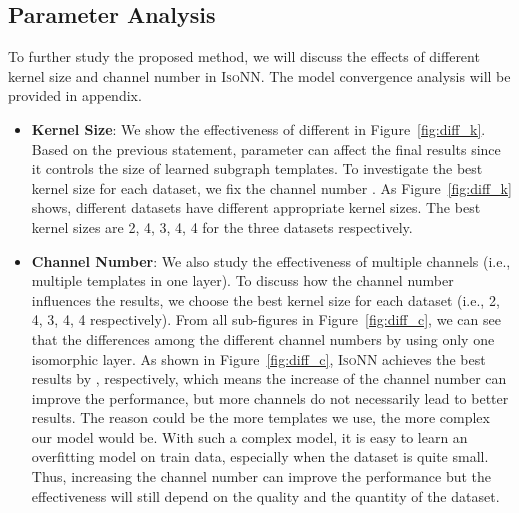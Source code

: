 \documentclass{article} \usepackage{iclr2020_conference,times}
\newcommand{\our}{\textsc{IsoNN}}
\begin{document}
\begin{figure*}[t]
	\centering
			\vspace*{-20pt}
\vspace{-10pt}
	\caption{Effectiveness of Different k}
	\vspace{-18pt}
	\label{fig:diff_k}
\end{figure*}
\vspace*{-11pt}
\subsection{ Parameter Analysis}
\vspace*{-5pt}
To further study the proposed method, we will discuss the effects of different kernel size and channel number in {\our}. The model convergence analysis will be provided in appendix.
\begin{itemize}
	\vspace*{-7pt}
	\item \textbf{Kernel Size}:
	We show the effectiveness of different  in Figure~\ref{fig:diff_k}. Based on the previous statement, parameter  can affect the final results since it controls the size of learned subgraph templates. To investigate the best kernel size for each dataset, we fix the channel number . As Figure~\ref{fig:diff_k} shows, different datasets have different appropriate kernel sizes. The best kernel sizes are 2, 4, 3, 4, 4 for the three datasets respectively. 
	\vspace*{-5pt}
	\item \textbf{Channel Number}:
	We also study the effectiveness of multiple channels (i.e., multiple templates in one layer). To discuss how the channel number influences the results, we choose the best kernel size for each dataset (i.e., 2, 4, 3, 4, 4 respectively). From all sub-figures in Figure~\ref{fig:diff_c}, we can see that the differences among the different channel numbers by using only one isomorphic layer. As shown in Figure~\ref{fig:diff_c},  {\our} achieves the best results by , respectively, which means the increase of the channel number can improve the performance, but more channels do not necessarily lead to better results. The reason could be the more templates we use,  the more complex our model would be. With such a complex model, it is easy to learn an overfitting model on train data, especially when the dataset is quite small. Thus, increasing the channel number can improve the performance but the effectiveness will still depend on the quality and the quantity of the dataset.
\end{itemize}
\end{document}
